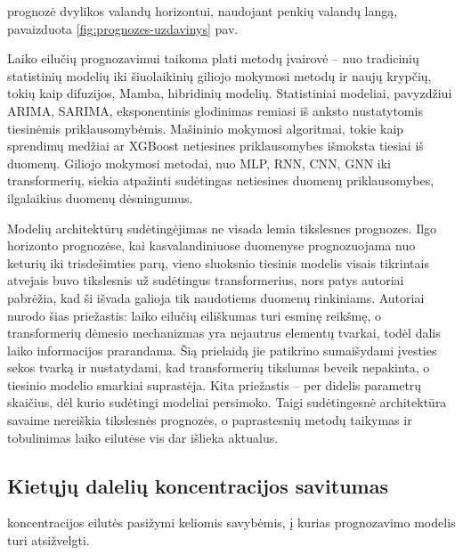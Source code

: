 \documentclass[]{VUMIFTemplateClass}
\begin{document}
     prognozė dvylikos valandų horizontui, naudojant penkių valandų langą, pavaizduota \ref{fig:prognozes-uzdavinys} pav.

    

    Laiko eilučių prognozavimui taikoma plati metodų įvairovė -- nuo tradicinių statistinių modelių iki šiuolaikinių giliojo mokymosi metodų ir naujų krypčių, tokių kaip difuzijos, Mamba, hibridinių modelių\cite{kim2025comprehensivesurveydeeplearning}.
    Statistiniai modeliai, pavyzdžiui ARIMA, SARIMA, eksponentinis glodinimas remiasi iš anksto nustatytomis tiesinėmis priklausomybėmis.
    Mašininio mokymosi algoritmai, tokie kaip sprendimų medžiai ar XGBoost netiesines priklausomybes išmoksta tiesiai iš duomenų.
    Giliojo mokymosi metodai, nuo MLP, RNN, CNN, GNN iki transformerių, siekia atpažinti sudėtingas netiesines duomenų priklausomybes, ilgalaikius duomenų dėsningumus.

    Modelių architektūrų sudėtingėjimas ne visada lemia tikslesnes prognozes.
    Ilgo horizonto prognozėse, kai kasvalandiniuose duomenyse prognozuojama nuo keturių iki trisdešimties parų, vieno sluoksnio tiesinis modelis visais tikrintais atvejais buvo tikslesnis už sudėtingus transformerius, nors patys autoriai pabrėžia, kad ši išvada galioja tik naudotiems duomenų rinkiniams\cite{zeng2022transformerseffectivetimeseries}.
    Autoriai nurodo šias priežastis: laiko eilučių eiliškumas turi esminę reikšmę, o transformerių dėmesio mechanizmas yra nejautrus elementų tvarkai, todėl dalis laiko informacijos prarandama.
    Šią prielaidą jie patikrino sumaišydami įvesties sekos tvarką ir nustatydami, kad transformerių tikslumas beveik nepakinta, o tiesinio modelio smarkiai suprastėja.
    Kita priežastis -- per didelis parametrų skaičius, dėl kurio sudėtingi modeliai persimoko.
    Taigi sudėtingesnė architektūra savaime nereiškia tikslesnės prognozės, o paprastesnių metodų taikymas ir tobulinimas laiko eilutėse vis dar išlieka aktualus.


    \subsection{Kietųjų dalelių koncentracijos savitumas}
    \label{subsec:savitumas}

     koncentracijos eilutės pasižymi keliomis savybėmis, į kurias prognozavimo modelis turi atsižvelgti.
\end{document}
